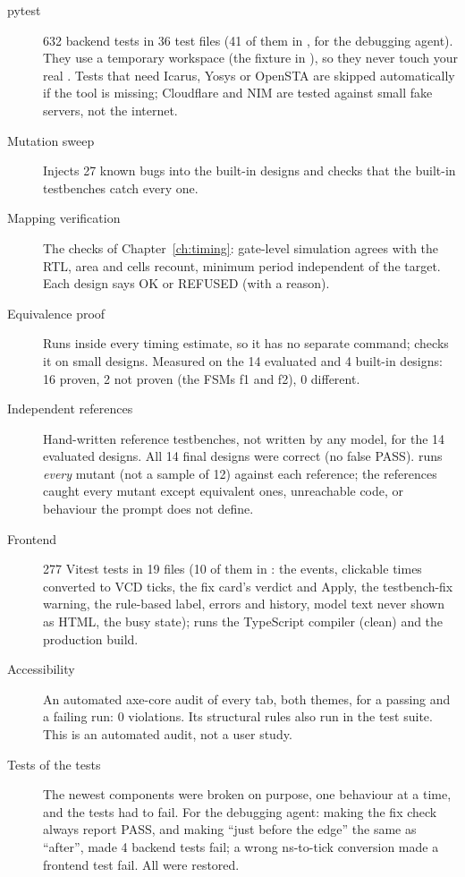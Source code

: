 \begin{description}
  \item[pytest] 632 backend tests in 36 test files (41 of them in , for the debugging agent). They use a temporary workspace (the  fixture in ), so they never touch your real . Tests that need Icarus, Yosys or OpenSTA are skipped automatically if the tool is missing; Cloudflare and NIM are tested against small fake servers, not the internet.
  \item[Mutation sweep] Injects 27 known bugs into the built-in designs and checks that the built-in testbenches catch every one.
  \item[Mapping verification] The checks of Chapter~\ref{ch:timing}: gate-level simulation agrees with the RTL, area and cells recount, minimum period independent of the target. Each design says OK or REFUSED (with a reason).
  \item[Equivalence proof] Runs inside every timing estimate, so it has no separate command;  checks it on small designs. Measured on the 14 evaluated and 4 built-in designs: 16 proven, 2 not proven (the FSMs f1 and f2), 0 different.
  \item[Independent references] Hand-written reference testbenches, not written by any model, for the 14 evaluated designs. All 14 final designs were correct (no false PASS).  runs \emph{every} mutant (not a sample of 12) against each reference; the references caught every mutant except equivalent ones, unreachable code, or behaviour the prompt does not define.
  \item[Frontend] 277 Vitest tests in 19 files (10 of them in : the events, clickable times converted to VCD ticks, the fix card's verdict and Apply, the testbench-fix warning, the rule-based label, errors and history, model text never shown as HTML, the busy state);  runs the TypeScript compiler (clean) and the production build.
  \item[Accessibility] An automated axe-core audit of every tab, both themes, for a passing and a failing run: 0 violations. Its structural rules also run in the test suite. This is an automated audit, not a user study.
  \item[Tests of the tests] The newest components were broken on purpose, one behaviour at a time, and the tests had to fail. For the debugging agent: making the fix check always report PASS, and making ``just before the edge'' the same as ``after'', made 4 backend tests fail; a wrong ns-to-tick conversion made a frontend test fail. All were restored.
\end{description}

